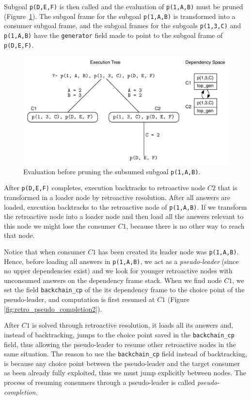 Subgoal \texttt{p(D,E,F)} is then called and the evaluation of \texttt{p(1,A,B)} must be pruned 
(Figure~\ref{fig:retro_pseudo_completion1}). The subgoal frame for the subgoal \texttt{p(1,A,B)} is
transformed into a consumer subgoal frame, and the subgoal frames for the subgoals \texttt{p(1,3,C)} and
\texttt{p(1,A,B)} have the \texttt{generator} field made to point to the subgoal frame of \texttt{p(D,E,F)}. 

\begin{figure}[ht]
  \centering
    \includegraphics[scale=0.6]{retro_pseudo_completion1.pdf}
  \caption{Evaluation before pruning the subsumed subgoal \texttt{p(1,A,B)}.}
  \label{fig:retro_pseudo_completion1}
\end{figure}

After \texttt{p(D,E,F)} completes, execution backtracks to retroactive node $C2$ that is transformed
in a loader node by retroactive resolution. After all answers are loaded, execution backtracks to
the retroactive node of \texttt{p(1,A,B)}. If we transform the retroactive node into a loader node and
then load all the answers relevant to this node we might lose the consumer $C1$, because there is no
other way to reach that node.

Notice that when consumer $C1$ has been created its leader node was
\texttt{p(1,A,B)}. Hence, before loading all answers in \texttt{p(1,A,B)}, we act as a \textit{pseudo-leader}
(since no upper dependencies exist) and we look for younger retroactive nodes with unconsumed answers on the dependency
frame stack. When we find node $C1$, we set the field \texttt{backchain\_cp} of the its dependency
frame to the choice point of the pseudo-leader, and computation is first resumed at $C1$
(Figure \ref{fig:retro_pseudo_completion2}).

After $C1$ is solved through retroactive resolution, it loads all its answers and, instead of backtracking,
jumps to the choice point saved in the \texttt{backchain\_cp} field, thus allowing the pseudo-leader to resume
other retroactive nodes in the same situation. The reason to use the \texttt{backchain\_cp} field instead of
backtracking, is because any choice point between the pseudo-leader and the target consumer as been already fully
exploited, thus we must jump explicitly between nodes. The process of resuming consumers through a pseudo-leader
is called \textit{pseudo-completion}.

